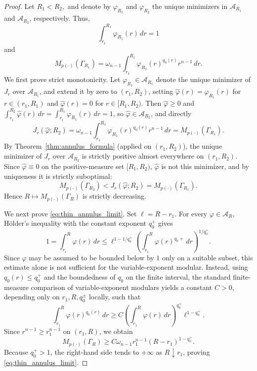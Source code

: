 \documentclass[12pt]{amsart}
\numberwithin{equation}{section}
\theoremstyle{plain}
\theoremstyle{definition}
\begin{document}
\begin{proof}
Let $R_1<R_2,$ and denote by $\varphi_{R_1}$ and $\varphi_{R_2}$ the unique minimizers in $\mathcal A_{R_1}$ and $\mathcal A_{R_2}$, respectively. Thus,
\begin{equation*}
\int_{r_1}^{R_1}\varphi_{R_1}(r)\,dr=1
\end{equation*}
and
\begin{equation*}
M_{p(\cdot)}(\Gamma_{R_1}) = \omega_{n-1} \int_{r_1}^{R_1} \varphi_{R_1}(r)^{q_0(r)}r^{n-1}\,dr.
\end{equation*}
We first prove strict monotonicity. Let $\varphi_{R_1}\in\mathcal A_{R_1}$ denote the unique minimizer of $J_r$ over $\mathcal A_{R_1}$, and extend it by zero to $(r_1,R_2)$, setting $\widehat\varphi(r)=\varphi_{R_1}(r)$ for $r\in(r_1,R_1)$ and $\widehat\varphi(r)=0$ for $r\in[R_1,R_2)$. Then $\widehat\varphi\ge0$ and $\int_{r_1}^{R_2}\widehat\varphi(r)\,dr =\int_{r_1}^{R_1}\varphi_{R_1}(r)\,dr=1$, so $\widehat\varphi\in\mathcal A_{R_2}$, and directly
\begin{equation*}
J_r(\widehat\varphi;R_2) =\omega_{n-1}\int_{r_1}^{R_1}\varphi_{R_1}(r)^{q_0(r)}r^{n-1}\,dr =M_{p(\cdot)}(\Gamma_{R_1}).
\end{equation*}
By Theorem~\ref{thm:annulus_formula} (applied on $(r_1,R_2)$), the unique minimizer of $J_r$ over $\mathcal A_{R_2}$ is strictly positive almost everywhere on $(r_1,R_2)$. Since $\widehat\varphi\equiv0$ on the positive-measure set $[R_1,R_2)$, $\widehat\varphi$ is not this minimizer, and by uniqueness it is strictly suboptimal:
\begin{equation*}
M_{p(\cdot)}(\Gamma_{R_2}) < J_r(\widehat\varphi;R_2) = M_{p(\cdot)}(\Gamma_{R_1}).
\end{equation*}
Hence $R\longmapsto M_{p(\cdot)}(\Gamma_R)$ is strictly decreasing.

We next prove \eqref{eq:thin_annulus_limit}. Set $\ell=R-r_1.$ For every $\varphi\in\mathcal A_{R}$, H\"older's inequality with the constant exponent $q_0^+$ gives
\begin{equation*}
1 = \int_{r_1}^{R}\varphi(r)\,dr \le \ell^{1-1/q_0^+} \left( \int_{r_1}^{R}\varphi(r)^{q_0+}\,dr \right)^{1/q_0^+}.
\end{equation*}
Since $\varphi$ may be assumed to be bounded below by $1$ only on a suitable subset, this estimate alone is not sufficient for the variable-exponent modular. Instead, using $q_0(r)\le q_0^+$ and the boundedness of $q_0$ on the finite interval, the standard finite-measure comparison of variable-exponent modulars yields a constant $C>0$, depending only on $r_1,R,q_0^\pm$ locally, such that
\begin{equation*}
\int_{r_1}^{R}\varphi(r)^{q_0(r)}\,dr \ge C \left( \int_{r_1}^{R}\varphi(r)\,dr \right)^{q_0^+} \ell^{1-q_0^+}.
\end{equation*}
Since $r^{n-1}\ge r_1^{n-1}$ on $(r_1,R)$, we obtain
\begin{equation*}
M_{p(\cdot)}(\Gamma_R) \ge C\omega_{n-1}r_1^{n-1} (R-r_1)^{1-q_0^+}.
\end{equation*}
Because $q_0^+>1$, the right-hand side tends to $+\infty$ as $R\downarrow r_1$, proving \eqref{eq:thin_annulus_limit}.


\end{proof}
\end{document}
